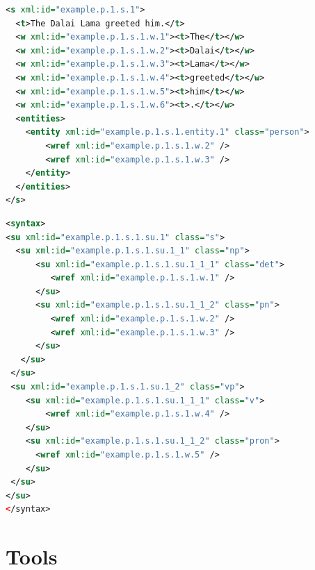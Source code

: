 \documentclass[compress,10pt]{beamer}
\begin{document}
\begin{frame}[fragile]
\begin{lstlisting}[language=xml]
<s xml:id="example.p.1.s.1">
  <t>The Dalai Lama greeted him.</t>
  <w xml:id="example.p.1.s.1.w.1"><t>The</t></w>
  <w xml:id="example.p.1.s.1.w.2"><t>Dalai</t></w>
  <w xml:id="example.p.1.s.1.w.3"><t>Lama</t></w>
  <w xml:id="example.p.1.s.1.w.4"><t>greeted</t></w>
  <w xml:id="example.p.1.s.1.w.5"><t>him</t></w>
  <w xml:id="example.p.1.s.1.w.6"><t>.</t></w>
  <entities>
    <entity xml:id="example.p.1.s.1.entity.1" class="person">
        <wref xml:id="example.p.1.s.1.w.2" />
        <wref xml:id="example.p.1.s.1.w.3" />
    </entity>
  </entities>
</s>
\end{lstlisting}                    
\end{frame}

\begin{frame}[fragile]
\begin{lstlisting}[language=xml]
<syntax>
<su xml:id="example.p.1.s.1.su.1" class="s">     
  <su xml:id="example.p.1.s.1.su.1_1" class="np">
      <su xml:id="example.p.1.s.1.su.1_1_1" class="det">
         <wref xml:id="example.p.1.s.1.w.1" />       
      </su>
      <su xml:id="example.p.1.s.1.su.1_1_2" class="pn">
         <wref xml:id="example.p.1.s.1.w.2" />
         <wref xml:id="example.p.1.s.1.w.3" />        
      </su>         
   </su>
 </su>
 <su xml:id="example.p.1.s.1.su.1_2" class="vp"> 
    <su xml:id="example.p.1.s.1.su.1_1_1" class="v">
        <wref xml:id="example.p.1.s.1.w.4" />       
    </su>
    <su xml:id="example.p.1.s.1.su.1_1_2" class="pron">
      <wref xml:id="example.p.1.s.1.w.5" />       
    </su>
 </su>    
</su>
</syntax>
\end{lstlisting}                    
\end{frame}



\section{Tools}
\end{document}
